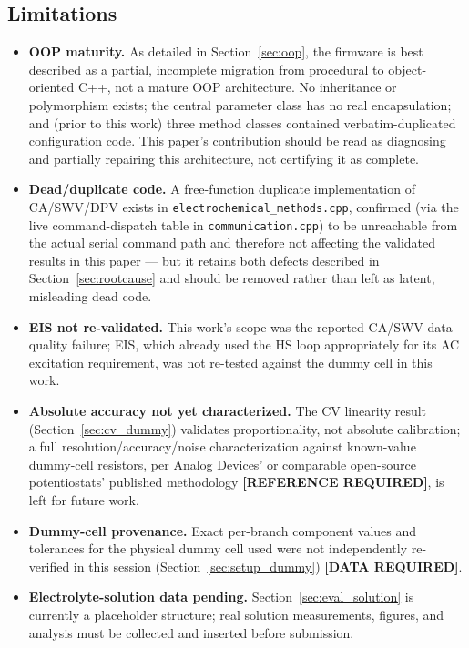 \documentclass[preprint,12pt]{elsarticle}
\begin{document}
\subsection{Limitations}
\label{sec:limitations}
\begin{itemize}
\item \textbf{OOP maturity.} As detailed in Section~\ref{sec:oop}, the firmware is best described as a partial, incomplete migration from procedural to object-oriented C++, not a mature OOP architecture. No inheritance or polymorphism exists; the central parameter class has no real encapsulation; and (prior to this work) three method classes contained verbatim-duplicated configuration code. This paper's contribution should be read as diagnosing and partially repairing this architecture, not certifying it as complete.
\item \textbf{Dead/duplicate code.} A free-function duplicate implementation of CA/SWV/DPV exists in \texttt{electrochemical\_methods.cpp}, confirmed (via the live command-dispatch table in \texttt{communication.cpp}) to be unreachable from the actual serial command path and therefore not affecting the validated results in this paper --- but it retains both defects described in Section~\ref{sec:rootcause} and should be removed rather than left as latent, misleading dead code.
\item \textbf{EIS not re-validated.} This work's scope was the reported CA/SWV data-quality failure; EIS, which already used the HS loop appropriately for its AC excitation requirement, was not re-tested against the dummy cell in this work.
\item \textbf{Absolute accuracy not yet characterized.} The CV linearity result (Section~\ref{sec:cv_dummy}) validates proportionality, not absolute calibration; a full resolution/accuracy/noise characterization against known-value dummy-cell resistors, per Analog Devices' or comparable open-source potentiostats' published methodology \textbf{[REFERENCE REQUIRED]}, is left for future work.
\item \textbf{Dummy-cell provenance.} Exact per-branch component values and tolerances for the physical dummy cell used were not independently re-verified in this session (Section~\ref{sec:setup_dummy}) \textbf{[DATA REQUIRED]}.
\item \textbf{Electrolyte-solution data pending.} Section~\ref{sec:eval_solution} is currently a placeholder structure; real solution measurements, figures, and analysis must be collected and inserted before submission.
\end{itemize}
\end{document}

